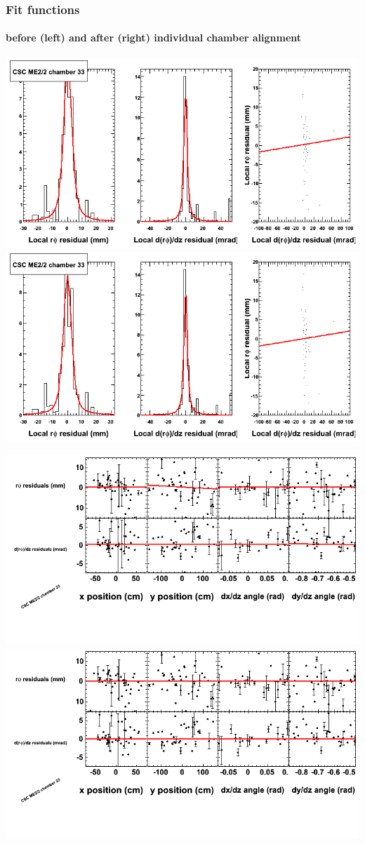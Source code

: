 \documentclass[compress]{beamer}
\begin{document}
\begin{frame}
\frametitle{Fit functions}
\framesubtitle{before (left) and after (right) individual chamber alignment}
\includegraphics[width=0.5\linewidth]{ringfits_3dof/beforefit_MEp22_33_bellcurve.png} \includegraphics[width=0.5\linewidth]{ringfits_3dof/afterfit_MEp22_33_bellcurve.png}

\includegraphics[width=0.5\linewidth]{ringfits_3dof/beforefit_MEp22_33_polynomials.png} \includegraphics[width=0.5\linewidth]{ringfits_3dof/afterfit_MEp22_33_polynomials.png}
\end{frame}
\end{document}
